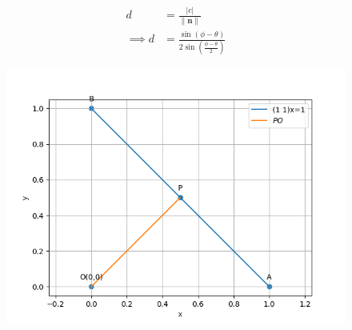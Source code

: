 \documentclass[10pt]{article}
\providecommand{\brak}[1]{\ensuremath{\left(#1\right)}}
\providecommand{\norm}[1]{\left\lVert#1\right\rVert}
\providecommand{\abs}[1]{\left\vert#1\right\vert}
\let\vec\mathbf{}
\begin{document}
\begin{enumerate}
\begin{align}
d&=\frac{\abs{c}}{\norm{\vec{n}}}\\
\implies d&=\frac{\sin\brak{\phi-\theta}}{2\sin\brak{\frac{\phi-\theta}{2}}}
\end{align}
\begin{figure}[!h]
	\begin{center}
		\includegraphics[width=\columnwidth]{./figs/fig.png}
	\end{center}
\caption{}
\label{fig:Fig1}
\end{figure}

\end{enumerate}
\end{document}
